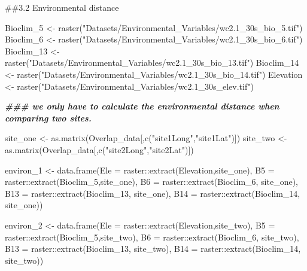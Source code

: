 \documentclass[
]{article}
\newenvironment{Shaded}{\begin{snugshade}}{\end{snugshade}}
\newcommand{\AttributeTok}[1]{\textcolor[rgb]{0.77,0.63,0.00}{#1}}
\newcommand{\DocumentationTok}[1]{\textcolor[rgb]{0.56,0.35,0.01}{\textbf{\textit{#1}}}}
\newcommand{\FunctionTok}[1]{\textcolor[rgb]{0.00,0.00,0.00}{#1}}
\newcommand{\NormalTok}[1]{#1}
\newcommand{\OtherTok}[1]{\textcolor[rgb]{0.56,0.35,0.01}{#1}}
\newcommand{\SpecialCharTok}[1]{\textcolor[rgb]{0.00,0.00,0.00}{#1}}
\newcommand{\StringTok}[1]{\textcolor[rgb]{0.31,0.60,0.02}{#1}}
\begin{document}
\#\#3.2 Environmental distance

\begin{Shaded}
\begin{Highlighting}[]
\NormalTok{Bioclim\_5 }\OtherTok{\textless{}{-}} \FunctionTok{raster}\NormalTok{(}\StringTok{"Datasets/Environmental\_Variables/wc2.1\_30s\_bio\_5.tif"}\NormalTok{)}
\NormalTok{Bioclim\_6 }\OtherTok{\textless{}{-}} \FunctionTok{raster}\NormalTok{(}\StringTok{"Datasets/Environmental\_Variables/wc2.1\_30s\_bio\_6.tif"}\NormalTok{)}
\NormalTok{Bioclim\_13 }\OtherTok{\textless{}{-}} \FunctionTok{raster}\NormalTok{(}\StringTok{"Datasets/Environmental\_Variables/wc2.1\_30s\_bio\_13.tif"}\NormalTok{)}
\NormalTok{Bioclim\_14 }\OtherTok{\textless{}{-}} \FunctionTok{raster}\NormalTok{(}\StringTok{"Datasets/Environmental\_Variables/wc2.1\_30s\_bio\_14.tif"}\NormalTok{)}
\NormalTok{Elevation }\OtherTok{\textless{}{-}} \FunctionTok{raster}\NormalTok{(}\StringTok{"Datasets/Environmental\_Variables/wc2.1\_30s\_elev.tif"}\NormalTok{)}


\DocumentationTok{\#\#\# we only have to calculate the environmental distance when comparing two sites.}

\NormalTok{site\_one }\OtherTok{\textless{}{-}} \FunctionTok{as.matrix}\NormalTok{(Overlap\_data[,}\FunctionTok{c}\NormalTok{(}\StringTok{"site1Long"}\NormalTok{,}\StringTok{"site1Lat"}\NormalTok{)])}
\NormalTok{site\_two }\OtherTok{\textless{}{-}} \FunctionTok{as.matrix}\NormalTok{(Overlap\_data[,}\FunctionTok{c}\NormalTok{(}\StringTok{"site2Long"}\NormalTok{,}\StringTok{"site2Lat"}\NormalTok{)])}

\NormalTok{environ\_1 }\OtherTok{\textless{}{-}} \FunctionTok{data.frame}\NormalTok{(}\AttributeTok{Ele  =}\NormalTok{ raster}\SpecialCharTok{::}\FunctionTok{extract}\NormalTok{(Elevation,site\_one), }\AttributeTok{B5 =}\NormalTok{ raster}\SpecialCharTok{::}\FunctionTok{extract}\NormalTok{(Bioclim\_5,site\_one), }\AttributeTok{B6 =}\NormalTok{ raster}\SpecialCharTok{::}\FunctionTok{extract}\NormalTok{(Bioclim\_6, site\_one),}
                        \AttributeTok{B13 =}\NormalTok{ raster}\SpecialCharTok{::}\FunctionTok{extract}\NormalTok{(Bioclim\_13, site\_one), }\AttributeTok{B14 =}\NormalTok{ raster}\SpecialCharTok{::}\FunctionTok{extract}\NormalTok{(Bioclim\_14, site\_one))}

\NormalTok{environ\_2 }\OtherTok{\textless{}{-}} \FunctionTok{data.frame}\NormalTok{(}\AttributeTok{Ele  =}\NormalTok{ raster}\SpecialCharTok{::}\FunctionTok{extract}\NormalTok{(Elevation,site\_two), }\AttributeTok{B5 =}\NormalTok{ raster}\SpecialCharTok{::}\FunctionTok{extract}\NormalTok{(Bioclim\_5,site\_two), }\AttributeTok{B6 =}\NormalTok{ raster}\SpecialCharTok{::}\FunctionTok{extract}\NormalTok{(Bioclim\_6, site\_two),}
                        \AttributeTok{B13 =}\NormalTok{ raster}\SpecialCharTok{::}\FunctionTok{extract}\NormalTok{(Bioclim\_13, site\_two), }\AttributeTok{B14 =}\NormalTok{ raster}\SpecialCharTok{::}\FunctionTok{extract}\NormalTok{(Bioclim\_14, site\_two))}



\end{Highlighting}
\end{Shaded}
\end{document}
